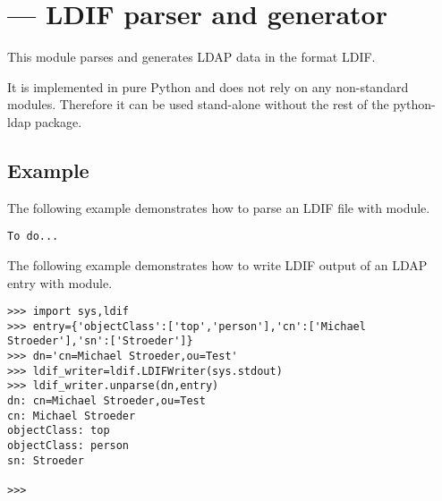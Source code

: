 

\section{ ---
         LDIF parser and generator}






This module parses and generates LDAP data in the format LDIF.

It is implemented in pure Python and does not rely on any
non-standard modules. Therefore it can be used stand-alone without
the rest of the python-ldap package.

\begin{seealso}
\end{seealso}

\subsection{Example \label{ldif-example}}

The following example demonstrates how to parse an LDIF file
with  module.

\begin{verbatim}
To do...
\end{verbatim}

The following example demonstrates how to write LDIF output
of an LDAP entry with  module.

\begin{verbatim}
>>> import sys,ldif
>>> entry={'objectClass':['top','person'],'cn':['Michael Stroeder'],'sn':['Stroeder']}
>>> dn='cn=Michael Stroeder,ou=Test'
>>> ldif_writer=ldif.LDIFWriter(sys.stdout)
>>> ldif_writer.unparse(dn,entry)
dn: cn=Michael Stroeder,ou=Test
cn: Michael Stroeder
objectClass: top
objectClass: person
sn: Stroeder

>>> 
\end{verbatim}
